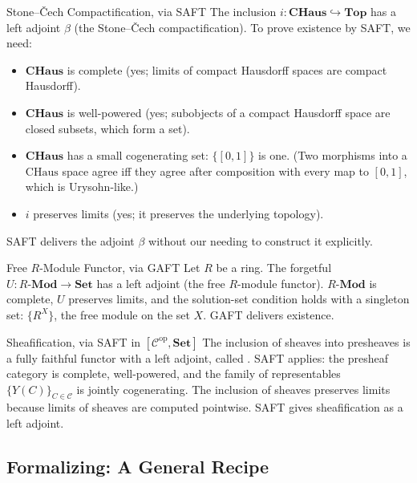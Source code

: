 \begin{example}{Stone--\v{C}ech Compactification, via SAFT}
The inclusion $i : \mathbf{CHaus} \hookrightarrow \mathbf{Top}$ has a
left adjoint $\beta$ (the Stone--\v{C}ech compactification). To prove
existence by SAFT, we need:
\begin{itemize}
  \item $\mathbf{CHaus}$ is complete (yes; limits of compact Hausdorff
        spaces are compact Hausdorff).
  \item $\mathbf{CHaus}$ is well-powered (yes; subobjects of a compact
        Hausdorff space are closed subsets, which form a set).
  \item $\mathbf{CHaus}$ has a small cogenerating set: $\{[0, 1]\}$ is
        one. (Two morphisms into a $\mathrm{CHaus}$ space agree iff
        they agree after composition with every map to $[0, 1]$, which
        is Urysohn-like.)
  \item $i$ preserves limits (yes; it preserves the underlying topology).
\end{itemize}
SAFT delivers the adjoint $\beta$ without our needing to construct it
explicitly.
\end{example}

\begin{example}{Free $R$-Module Functor, via GAFT}
Let $R$ be a ring. The forgetful $U : R\text{-}\mathbf{Mod} \to \mathbf{Set}$
has a left adjoint (the free $R$-module functor). $R\text{-}\mathbf{Mod}$
is complete, $U$ preserves limits, and the solution-set condition holds
with a singleton set: $\{R^X\}$, the free module on the set $X$. GAFT
delivers existence.
\end{example}

\begin{example}{Sheafification, via SAFT in $[\mathcal{C}^{\mathrm{op}}, \mathbf{Set}]$}
The inclusion of sheaves into presheaves is a fully faithful functor with
a left adjoint, called . SAFT applies: the presheaf
category is complete, well-powered, and the family of representables
$\{Y(C)\}_{C \in \mathcal{C}}$ is jointly cogenerating. The inclusion of
sheaves preserves limits because limits of sheaves are computed
pointwise. SAFT gives sheafification as a left adjoint.
\end{example}

\subsection{Formalizing: A General Recipe}

